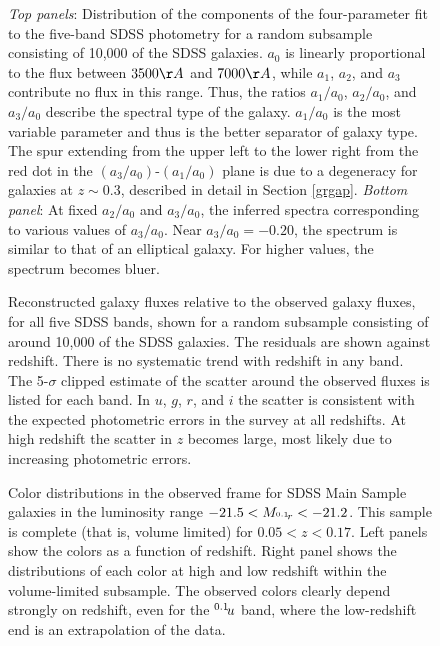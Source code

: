 \clearpage
{}
\begin{figure}
\figurenum{\fignum}
\caption{\label{k_coeffdist_plot} {\it Top panels}: Distribution of
the components of the four-parameter fit to the five-band SDSS
photometry for a random subsample consisting of 10,000 of the SDSS
galaxies. $a_0$ is linearly proportional to the flux between $3500\AA$
and $7000\AA$, while $a_1$, $a_2$, and $a_3$ contribute no flux in
this range. Thus, the ratios $a_1/a_0$, $a_2/a_0$, and $a_3/a_0$
describe the spectral type of the galaxy. $a_1/a_0$ is the most
variable parameter and thus is the better separator of galaxy
type. The spur extending from the upper left to the lower right from
the red dot in the $(a_3/a_0)$-$(a_1/a_0)$ plane is due to a
degeneracy for galaxies at $z\sim 0.3$, described in detail in Section
\ref{grgap}. {\it Bottom panel}: At fixed $a_2/a_0$ and $a_3/a_0$, the
inferred spectra corresponding to various values of $a_3/a_0$. Near
$a_3/a_0=-0.20$, the spectrum is similar to that of an elliptical
galaxy. For higher values, the spectrum becomes bluer. }
\end{figure}

\clearpage
{}
\begin{figure}
\figurenum{\fignum}
\caption{\label{k_model_plot} Reconstructed galaxy fluxes relative to
the observed galaxy fluxes, for all five SDSS bands, shown for a
random subsample consisting of around 10,000 of the SDSS galaxies. The
residuals are shown against redshift.  There is no systematic trend
with redshift in any band. The 5-$\sigma$ clipped estimate of the
scatter around the observed fluxes is listed for each band. In $u$,
$g$, $r$, and $i$ the scatter is consistent with the expected
photometric errors in the survey at all redshifts. At high redshift
the scatter in $z$ becomes large, most likely due to increasing
photometric errors. }
\end{figure}

\clearpage
{}
\begin{figure}
\figurenum{\fignum}
\caption{\label{main_colors_plot.z} Color distributions in the
observed frame for SDSS Main Sample galaxies in the luminosity range
$-21.5<M_{^{{0.1}}\!{r}}<-21.2$. This sample is complete (that is,
volume limited) for $0.05<z<0.17$. Left panels show the colors as a
function of redshift. Right panel shows the distributions of each
color at high and low redshift within the volume-limited
subsample. The observed colors clearly depend strongly on redshift,
even for the $^{{0.1}}\!{u}$ band, where the low-redshift end is an
extrapolation of the data.}
\end{figure}

